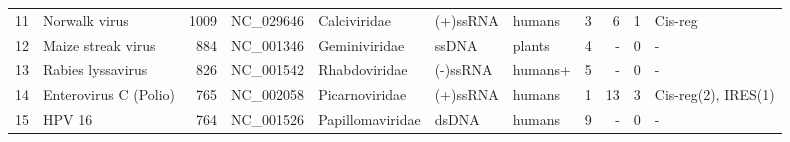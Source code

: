 \begin{center}
\begin{tabular}{r|l|r|l|l|l|l|r|r|r|l}
    11 & Norwalk virus      &        1009  & NC\_029646      & Calciviridae   & (+)ssRNA & humans &     3 &       6 & 1  & Cis-reg \\ 
    12 & Maize streak virus &         884  & NC\_001346      & Geminiviridae  & ssDNA    & plants &     4 &       - & 0  & -  \\
    13 & Rabies lyssavirus  &         826  & NC\_001542      & Rhabdoviridae  & (-)ssRNA & humans+&     5 &       - & 0  & -  \\
    14 & Enterovirus C (Polio) &      765  & NC\_002058      & Picarnoviridae & (+)ssRNA & humans &     1 &      13 & 3  & Cis-reg(2), IRES(1) \\
    15 & HPV 16             &         764  & NC\_001526      &Papillomaviridae& dsDNA    & humans &     9 &       - & 0  & - \\
\end{tabular}
\end{center}

